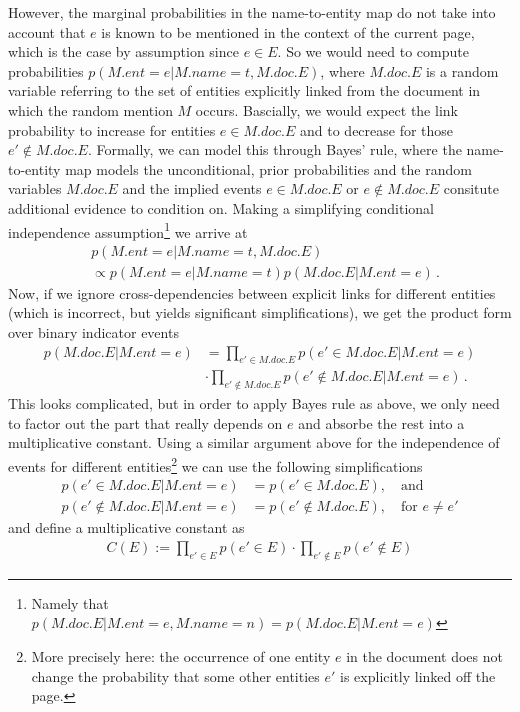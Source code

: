 \documentclass{article}
\begin{document}
However, the marginal probabilities in the name-to-entity map do not take into account that $e$ is known to be mentioned in the context of the current page, which is the case by assumption since $e \in E$. So we would need to compute probabilities $p(M.ent =e | M.name=t, M.doc.E)$, where $M.doc.E$ is a random variable referring to the set of entities explicitly linked from the document in which the random mention $M$ occurs. Bascially, we would expect the link probability to increase for entities $e \in M.doc.E$ and to decrease for those $e' \not\in M.doc.E$. Formally, we can model this through Bayes' rule, where the name-to-entity map models the unconditional, prior probabilities and the random variables $M.doc.E$ and the implied events $e \in M.doc.E$ or $e \not\in M.doc.E$ consitute additional evidence to condition on. Making a simplifying conditional independence assumption\footnote{Namely that  $ p(M.doc.E | M.ent=e, M.name=n) =  p(M.doc.E | M.ent=e)$} we arrive at 
\begin{align}
& p(M.ent =e | M.name=t, M.doc.E)  \\
& \propto  p(M.ent =e | M.name=t) p(M.doc.E | M.ent=e) \,. \nonumber
\end{align}
Now, if we ignore cross-dependencies between explicit links for different entities (which is incorrect, but yields significant simplifications), we get the product form over binary indicator events
\begin{align}
p(M.doc.E | M.ent=e) & = \prod_{e' \in M.doc.E} p(e' \in M.doc.E | M.ent=e) 
\\ & \cdot \prod_{e' \not \in M.doc.E} p(e' \not\in M.doc.E | M.ent = e) \,. \nonumber
\end{align}
This looks complicated, but in order to apply Bayes rule as above, we only need to factor out the part that really depends on $e$ and absorbe the rest into a multiplicative constant. Using a similar argument above for the independence of events for different entities\footnote{More precisely here: the occurrence of one entity $e$ in the document does not change the probability that some other entities $e'$ is explicitly linked off the page.} we can use the following simplifications
\begin{align}
p(e' \in M.doc.E | M.ent=e) & = p(e' \in M.doc.E), \quad \text{and}\\
p(e' \not\in M.doc.E | M.ent=e) & = p(e' \not\in M.doc.E), \quad \text{for $e \neq e'$} \nonumber
\end{align}
and define a multiplicative constant as 
\begin{align}
C(E) := \prod_{e' \in E} p(e' \in E) \cdot \prod_{e' \not \in E} p(e' \not\in E)
\end{align}
\end{document}
